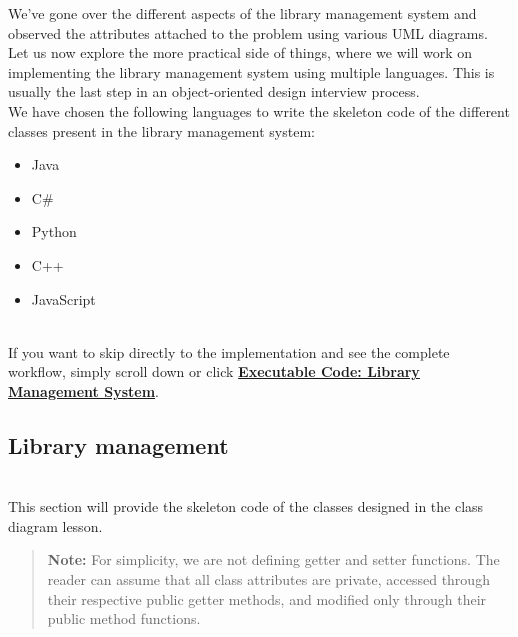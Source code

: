 

We've gone over the different aspects of the library management system and observed the attributes attached to the problem using various UML diagrams. Let us now explore the more practical side of things, where we will work on implementing the library management system using multiple languages. This is usually the last step in an object-oriented design interview process.
\\
We have chosen the following languages to write the skeleton code of the different classes present in the library management system:

\begin{itemize}
\item
\protect{}\label{5IqdwXmRp5jvqrxHtM1qW}
Java
\item
\protect{}\label{FehgZxJfaHT18MN8X-_Je}
C\#
\item
\protect{}\label{NPb7JgvteNP2-FO-1jUct}
Python
\item
\protect{}\label{zEbwRTKlsYxax2BBeyYIq}
C++
\item
\protect{}\label{vgdFm6wABiusYgxaEx9bp}
JavaScript
\end{itemize}
\\
If you want to skip directly to the implementation and see the complete workflow, simply scroll down or click \hyperref[Executable-code-Library-management-system]{\textbf{Executable Code: Library Management System}}.

\subsection{Library management}\label{sTgw9YDUl0ePssZT9QiUR}
\\
This section will provide the skeleton code of the classes designed in the class diagram lesson.
\begin{quote}
\textbf{Note:} For simplicity, we are not defining getter and setter functions. The reader can assume that all class attributes are private, accessed through their respective public getter methods, and modified only through their public method functions.
\end{quote}
